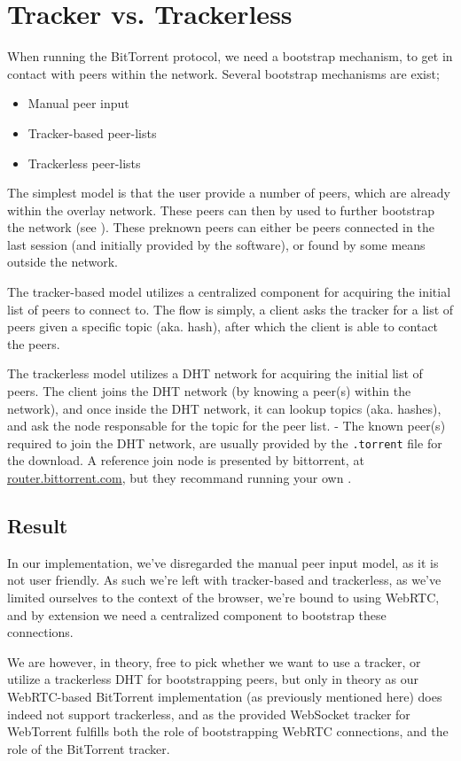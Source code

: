 \section{Tracker vs. Trackerless}
When running the BitTorrent protocol, we need a bootstrap mechanism, to get in
contact with peers within the network. Several bootstrap mechanisms are exist;
\begin{itemize}
\item Manual peer input
\item Tracker-based peer-lists
\item Trackerless peer-lists
\end{itemize}
The simplest model is that the user provide a number of peers, which are
already within the overlay network. These peers can then by used to further
bootstrap the network (see \citep{bittorrent:bep11}). These preknown peers
can either be peers connected in the last session (and initially provided by
the software), or found by some means outside the network.

The tracker-based model utilizes a centralized component for acquiring the
initial list of peers to connect to. The flow is simply, a client asks the
tracker for a list of peers given a specific topic (aka. hash), after which the
client is able to contact the peers.

The trackerless model utilizes a DHT network for acquiring the initial list of 
peers. The client joins the DHT network (by knowing a peer(s) within the network),
and once inside the DHT network, it can lookup topics (aka. hashes), and ask
the node responsable for the topic for the peer list.
\newline
- The known peer(s) required to join the DHT network, are usually provided by
the \verb|.torrent| file for the download. A reference join node is presented
by bittorrent, at \url{router.bittorrent.com}, but they recommand running your
own \citep{bittorrent:bep05}.

\subsection{Result}
In our implementation, we've disregarded the manual peer input model, as it is
not user friendly. As such we're left with tracker-based and trackerless, as 
we've limited ourselves to the context of the browser, we're bound to using 
WebRTC, and by extension we need a centralized component to bootstrap these
connections. 

We are however, in theory, free to pick whether we want to use a tracker, or 
utilize a trackerless DHT for bootstrapping peers, but only in theory as our
WebRTC-based BitTorrent implementation (as previously mentioned here) does
indeed not support trackerless, and as the provided WebSocket tracker for 
WebTorrent fulfills both the role of bootstrapping WebRTC connections, and the
role of the BitTorrent tracker.

